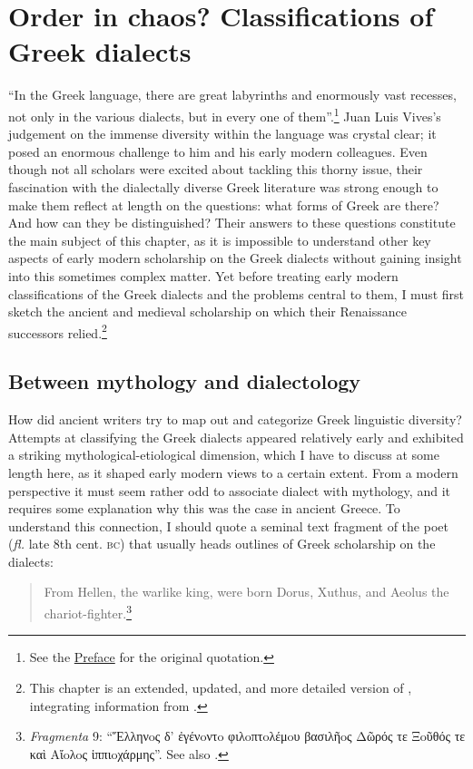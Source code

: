 \chapter{Order in chaos? Classifications of Greek dialects}\label{chap:2}

“In the Greek language, there are great labyrinths and enormously vast recesses, not only in the various dialects, but in every one of them”.\footnote{See the \hyperref[ch:preface]{Preface} for the original quotation.} Juan Luis Vives’s judgement on the immense diversity within the  language was crystal clear; it posed an enormous challenge to him and his early modern colleagues. Even though not all scholars were excited about tackling this thorny issue, their fascination with the dialectally diverse Greek literature was strong enough to make them reflect at length on the questions: what forms of Greek are there? And how can they be distinguished? Their answers to these questions constitute the main subject of this chapter, as it is impossible to understand other key aspects of early modern scholarship on the Greek dialects without gaining insight into this sometimes complex matter. Yet before treating early modern classifications of the Greek dialects and the problems central to them, I must first sketch the ancient and medieval scholarship on which their Renaissance successors relied.\footnote{This chapter is an extended, updated, and more detailed version of \citet{VanRooy2016a}, integrating information from \citet{VanRooy2018b}.}

\section{Between mythology and dialectology}\label{sec:2.1} 

How did ancient writers try to map out and categorize Greek linguistic diversity? Attempts at classifying the Greek dialects appeared relatively early and exhibited a striking mythological-etiological dimension, which I have to discuss at some length here, as it shaped early modern views to a certain extent. From a modern perspective it must seem rather odd to associate dialect with mythology, and it requires some explanation why this was the case in ancient Greece. To understand this connection, I should quote a seminal text fragment of the poet  (\textit{fl.} late 8th cent. \textsc{bc}) that usually heads outlines of Greek scholarship on the dialects:

\begin{quote}
From Hellen, the warlike king, were born  Dorus, Xuthus, and Aeolus the chariot-fighter.\footnote{\textit{Fragmenta} 9: “Ἕλληνoς δ’ ἐγένoντo φιλoπτoλέμoυ βασιλῆoς {\textbar} Δῶρός τε Ξoῦθός τε καὶ Aἴoλoς ἱππιoχάρμης”. See also \citet[64]{Hainsworth1967}.}
\end{quote}


